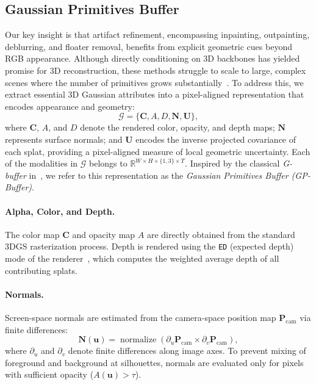 

\subsection{Gaussian Primitives Buffer}
Our key insight is that artifact refinement, encompassing inpainting, outpainting, deblurring, and floater removal, benefits from explicit geometric cues beyond RGB appearance. 
Although directly conditioning on 3D backbones has yielded promise for 3D reconstruction, these methods struggle to scale to large, complex scenes where the number of primitives grows substantially~\cite{chen2024splatformer,liu2024reconx}. To address this, we extract essential 3D Gaussian attributes into a pixel-aligned representation that encodes appearance and geometry:
\begin{equation}
    \mathcal{G} = \{\mathbf{C}, A, D, \mathbf{N}, \mathbf{U}\},
    \label{eq:gbuffer}
\end{equation}
where $\mathbf{C}$, $A$, and $D$ denote the rendered color, opacity, and depth maps; 
$\mathbf{N}$ represents surface normals; 
and $\mathbf{U}$ encodes the inverse projected covariance of each splat, providing a pixel-aligned measure of local geometric uncertainty.
Each of the modalities in $\mathcal{G}$ belongs to $\mathbb{R}^{W \times H \times \{1,3\}\times T }$.
Inspired by the classical \emph{G-buffer} in~\cite{liang2025diffusionrenderer}, we refer to this representation as the \textit{Gaussian Primitives Buffer (GP-Buffer)}.

\paragraph{Alpha, Color, and Depth.}
The color map $\mathbf{C}$ and opacity map $A$ are directly obtained from the standard 3DGS rasterization process. 
Depth is rendered using the \texttt{ED} (expected depth) mode of the renderer~\cite{ye2025gsplat}, which computes the weighted average depth of all contributing splats. 

\paragraph{Normals.}
Screen-space normals are estimated from the camera-space position map $\mathbf{P}_{\text{cam}}$ via finite differences:
\begin{equation}
\mathbf{N}(\mathbf{u}) = \operatorname{normalize}\!\left(\partial_u \mathbf{P}_{\text{cam}} \times \partial_v \mathbf{P}_{\text{cam}}\right),
\end{equation}
where $\partial_u$ and $\partial_v$ denote finite differences along image axes. 
To prevent mixing of foreground and background at silhouettes, normals are evaluated only for pixels with sufficient opacity ($A(\mathbf{u}) > \tau$). 
\vspace{-5pt}
